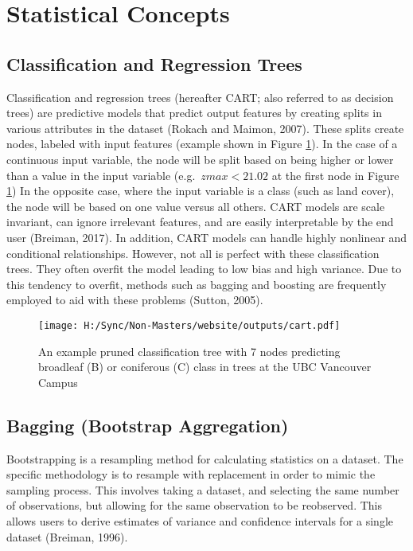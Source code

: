 \documentclass[
]{article}
\begin{document}
\hypertarget{statistical-concepts}{%
\section{Statistical Concepts}\label{statistical-concepts}}

\hypertarget{classification-and-regression-trees}{%
\subsection{Classification and Regression Trees}\label{classification-and-regression-trees}}

Classification and regression trees (hereafter CART; also referred to as decision trees) are predictive models that predict output features by creating splits in various attributes in the dataset (Rokach and Maimon, 2007). These splits create nodes, labeled with input features (example shown in Figure \ref{fig:classtree}). In the case of a continuous input variable, the node will be split based on being higher or lower than a value in the input variable (e.g.~\(zmax < 21.02\) at the first node in Figure \ref{fig:classtree}) In the opposite case, where the input variable is a class (such as land cover), the node will be based on one value versus all others. CART models are scale invariant, can ignore irrelevant features, and are easily interpretable by the end user (Breiman, 2017). In addition, CART models can handle highly nonlinear and conditional relationships. However, not all is perfect with these classification trees. They often overfit the model leading to low bias and high variance. Due to this tendency to overfit, methods such as bagging and boosting are frequently employed to aid with these problems (Sutton, 2005).

\begin{figure}
\centering
\texttt{[image: H:/Sync/Non-Masters/website/outputs/cart.pdf]}
\caption{\label{fig:classtree}An example pruned classification tree with 7 nodes predicting broadleaf (B) or coniferous (C) class in trees at the UBC Vancouver Campus}
\end{figure}

\hypertarget{bagging-bootstrap-aggregation}{%
\subsection{Bagging (Bootstrap Aggregation)}\label{bagging-bootstrap-aggregation}}

Bootstrapping is a resampling method for calculating statistics on a dataset. The specific methodology is to resample with replacement in order to mimic the sampling process. This involves taking a dataset, and selecting the same number of observations, but allowing for the same observation to be reobserved. This allows users to derive estimates of variance and confidence intervals for a single dataset (Breiman, 1996).
\end{document}
